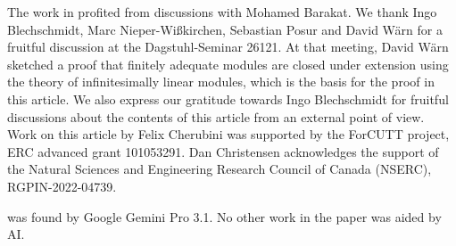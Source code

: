 The work in  profited from discussions with Mohamed Barakat.
We thank Ingo Blechschmidt, Marc Nieper-Wißkirchen, Sebastian Posur and David Wärn for a fruitful discussion at the Dagstuhl-Seminar 26121.
At that meeting, David Wärn sketched a proof that finitely adequate modules are closed under extension using the theory of infinitesimally linear modules, which is the basis for the proof in this article.
We also express our gratitude towards Ingo Blechschmidt for fruitful discussions about the contents of this article from an external point of view.
Work on this article by Felix Cherubini was supported by the ForCUTT project, ERC advanced grant 101053291.
Dan Christensen acknowledges the support of the Natural Sciences and Engineering Research Council of Canada (NSERC), RGPIN-2022-04739.

 was found by Google Gemini Pro 3.1.
No other work in the paper was aided by AI.
